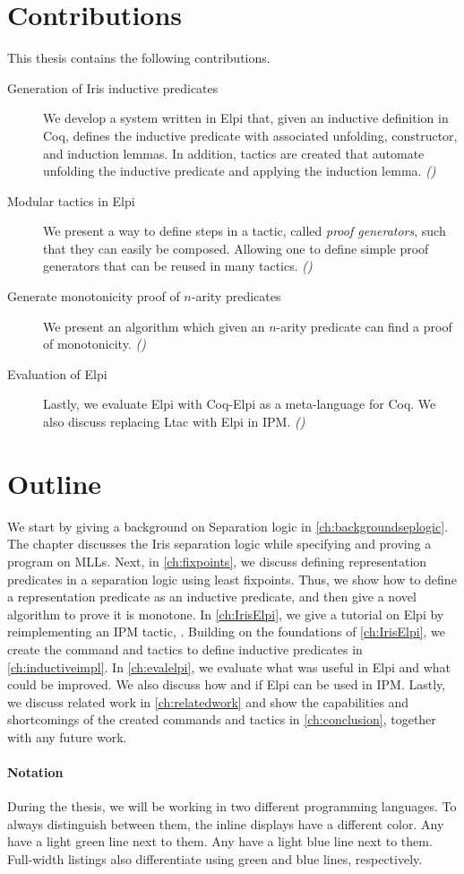 \documentclass[thesis.tex]{subfiles}
\begin{document}
\section{Contributions}
This thesis contains the following contributions.
\begin{description}
  \item[Generation of Iris inductive predicates] We develop a system written in Elpi that, given an inductive definition in Coq, defines the inductive predicate with associated unfolding, constructor, and induction lemmas. In addition, tactics are created that automate unfolding the inductive predicate and applying the induction lemma. \emph{()}
  \item[Modular tactics in Elpi] We present a way to define steps in a tactic, called \emph{proof generators}, such that they can easily be composed. Allowing one to define simple proof generators that can be reused in many tactics. \emph{()}
  \item[Generate monotonicity proof of $n$-arity predicates] We present an algorithm which given an $n$-arity predicate can find a proof of monotonicity. \emph{()}
  \item[Evaluation of Elpi] Lastly, we evaluate Elpi with Coq-Elpi as a meta-language for Coq. We also discuss replacing Ltac with Elpi in IPM. \emph{()}
\end{description}

\section{Outline}
We start by giving a background on Separation logic in \cref{ch:backgroundseplogic}. The chapter discusses the Iris separation logic while specifying and proving a program on MLLs. Next, in \cref{ch:fixpoints}, we discuss defining representation predicates in a separation logic using least fixpoints. Thus, we show how to define a representation predicate as an inductive predicate, and then give a novel algorithm to prove it is monotone. In \cref{ch:IrisElpi}, we give a tutorial on Elpi by reimplementing an IPM tactic, . Building on the foundations of \cref{ch:IrisElpi}, we create the command and tactics to define inductive predicates in \cref{ch:inductiveimpl}. In \cref{ch:evalelpi}, we evaluate what was useful in Elpi and what could be improved. We also discuss how and if Elpi can be used in IPM. Lastly, we discuss related work in \cref{ch:relatedwork} and show the capabilities and shortcomings of the created commands and tactics in \cref{ch:conclusion}, together with any future work.

\paragraph{Notation}
During the thesis, we will be working in two different programming languages. To always distinguish between them, the inline displays have a different color. Any  have a light green line next to them. Any  have a light blue line next to them. Full-width listings also differentiate using green and blue lines, respectively.
\end{document}
